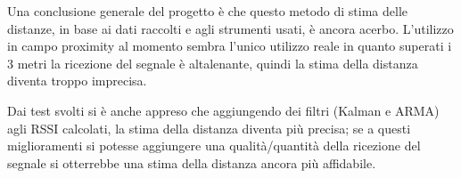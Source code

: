 Una conclusione generale del progetto è che questo metodo di stima delle distanze, in base ai dati raccolti e agli strumenti usati, è ancora acerbo. L'utilizzo in campo proximity al momento sembra l'unico utilizzo reale in quanto superati i 3 metri la ricezione del segnale è altalenante, quindi la stima della distanza diventa troppo imprecisa.

Dai test svolti si è anche appreso che aggiungendo dei filtri (Kalman e ARMA) agli RSSI calcolati, la stima della distanza diventa più precisa; se a questi miglioramenti si potesse aggiungere una qualità/quantità della ricezione del segnale si otterrebbe una stima della distanza ancora più affidabile.